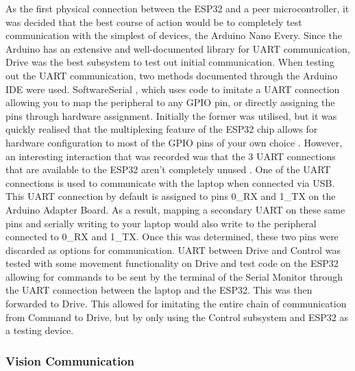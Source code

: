 \documentclass[a4paper]{article}
\begin{document}
As the first physical connection between the ESP32 and a peer 
microcontroller, it was decided that the best course of action would 
be to completely test communication with the simplest of devices, 
the Arduino Nano Every. Since the Arduino has an extensive 
and well-documented library for UART communication, Drive was the 
best subsystem to test out initial communication. When testing out the 
UART communication, two methods documented through the Arduino IDE were used. 
SoftwareSerial \cite{ESPSoftwareSerial}, which uses code to imitate a 
UART connection allowing you to map the peripheral to any GPIO pin, 
or directly assigning the pins through hardware assignment. 
Initially the former was utilised, but it was quickly realised that the 
multiplexing feature of the ESP32 chip allows for hardware configuration 
to most of the GPIO pins of your own choice \cite{ESP32PinOut}. However, 
an interesting interaction that was recorded was that the 3 UART connections 
that are available to the ESP32 aren’t completely unused \cite{ESPHardwareUART}. 
One of the UART connections is used to communicate with the laptop when 
connected via USB. This UART connection by default is assigned to pins 
0\_RX and 1\_TX on the Arduino Adapter Board. As a result, 
mapping a secondary UART on these same pins and serially writing 
to your laptop would also write to the peripheral connected to 
0\_RX and 1\_TX. Once this was determined, these two pins were 
discarded as options for communication. UART between Drive and Control 
was tested with some movement functionality on Drive and test code on the 
ESP32 allowing for commands to be sent by the terminal of the 
Serial Monitor through the UART connection between the laptop and the 
ESP32. This was then forwarded to Drive. This allowed for imitating the 
entire chain of communication from Command to Drive, but by only using the 
Control subsystem and ESP32 as a testing device.

\subsubsection{Vision Communication}
\end{document}
